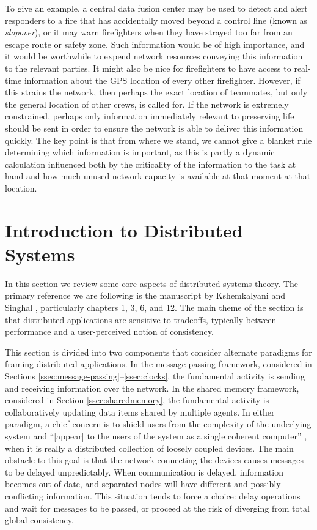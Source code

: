 \documentclass[]             %
{NASA}                       %
\theoremstyle{definition}
\begin{document}
To give an example, a central data fusion center may be used to detect
and alert responders to a fire that has accidentally moved beyond a
control line (known as \emph{slopover}), or it may warn firefighters
when they have strayed too far from an escape route or safety
zone. Such information would be of high importance, and it would be
worthwhile to expend network resources conveying this information to
the relevant parties. It might also be nice for firefighters to have
access to real-time information about the GPS location of every other
firefighter. However, if this strains the network, then perhaps the
exact location of teammates, but only the general location of other
crews, is called for. If the network is extremely constrained, perhaps
only information immediately relevant to preserving life should be
sent in order to ensure the network is able to deliver this
information quickly. The key point is that from where we stand, we
cannot give a blanket rule determining which information is important,
as this is partly a dynamic calculation influenced both by the
criticality of the information to the task at hand and how much unused
network capacity is available at that moment at that location.

\section{Introduction to Distributed Systems}
\label{sec:background}
In this section we review some core aspects of distributed systems
theory. The primary reference we are following is the manuscript by
Kshemkalyani and Singhal \cite{kshemkalyani_singhal_2008},
particularly chapters 1, 3, 6, and 12. The main theme of the section
is that distributed applications are sensitive to tradeoffs, typically
between performance and a user-perceived notion of consistency.

This section is divided into two components that consider alternate
paradigms for framing distributed applications. In the message passing
framework, considered in Sections
\ref{ssec:message-passing}--\ref{ssec:clocks}, the fundamental
activity is sending and receiving information over the network. In the
shared memory framework, considered in Section
\ref{ssec:sharedmemory}, the fundamental activity is collaboratively
updating data items shared by multiple agents. In either paradigm, a
chief concern is to shield users from the complexity of the underlying
system and ``{[}appear{]} to the users of the system as a single
coherent computer'' \cite{TanenbaumSteen07}, when it is really a
distributed collection of loosely coupled devices. The main obstacle
to this goal is that the network connecting the devices causes
messages to be delayed unpredictably. When communication is delayed,
information becomes out of date, and separated nodes will have
different and possibly conflicting information. This situation tends
to force a choice: delay operations and wait for messages to be
passed, or proceed at the risk of diverging from total global
consistency.
\end{document}
